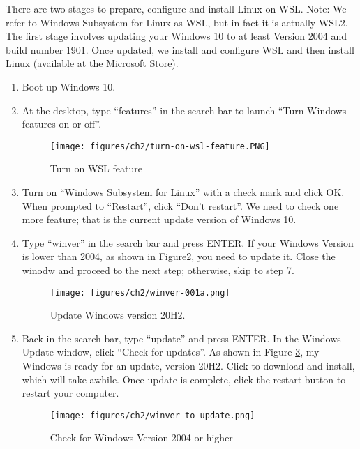 There are two stages to prepare, configure and install Linux on WSL. Note: We refer to Windows Subsystem for Linux as WSL, but in fact it is actually WSL2. The first stage involves updating your Windows 10 to at least Version 2004 and build number 1901. Once updated, we install and configure WSL and then install Linux (available at the Microsoft Store).

\begin{enumerate}

   \item Boot up Windows 10.

   \item At the desktop, type ``features'' in the search bar to launch ``Turn Windows features on or off''. 
\begin{figure}[hbt!]\centering
\texttt{[image: figures/ch2/turn-on-wsl-feature.PNG]}
\caption{Turn on WSL feature}\label{fig:wsl-feature} %
\end{figure}

\item Turn on ``Windows Subsystem for Linux'' with a check mark and click OK. When prompted to ``Restart'', click ``Don't restart''. We need to check one more feature; that is the current update version of Windows 10.  

\item Type ``winver'' in the search bar and press ENTER. If your Windows Version is lower than 2004, as shown in Figure\ref{fig:windows-version}, you need to update it. Close the winodw and proceed to the next step; otherwise, skip to step 7.
\begin{figure}[hbt!]\centering
\texttt{[image: figures/ch2/winver-001a.png]}
\caption{Update Windows version 20H2.}\label{fig:windows-version} %
\end{figure}

\item Back in the search bar, type ``update'' and press ENTER. In the Windows Update window, click ``Check for updates''. As shown in Figure \ref{fig:winver-update}, my Windows is ready for an update, version 20H2. Click to download and install, which will take awhile. Once update is complete, click the restart button to restart your computer. 
\begin{figure}[hbt!]\centering
\texttt{[image: figures/ch2/winver-to-update.png]}
\caption{Check for Windows Version 2004 or higher}\label{fig:winver-update} %
\end{figure}


\end{enumerate}
